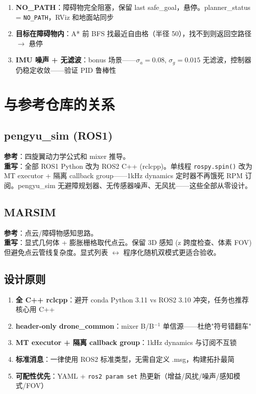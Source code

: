 \documentclass[12pt,a4paper]{article}
\begin{document}
\begin{enumerate}[nosep]
  \item \textbf{NO\_PATH}：障碍物完全阻塞，保留 last safe\_goal，悬停。planner\_status = \texttt{NO\_PATH}，RViz 和地面站同步
  \item \textbf{目标在障碍物内}：A* 前 BFS 找最近自由格（半径 50），找不到则返回空路径 $\to$ 悬停
  \item \textbf{IMU 噪声 + 无滤波}：bonus 场景——$\sigma_a=0.08$, $\sigma_g=0.015$ 无滤波，控制器仍稳定收敛——验证 PID 鲁棒性
\end{enumerate}


\section{与参考仓库的关系}

\subsection{pengyu\_sim (ROS1)}

\textbf{参考}：四旋翼动力学公式和 mixer 推导。\\
\textbf{重写}：全部 ROS1 Python 改为 ROS2 C++ (rclcpp)。单线程 \texttt{rospy.spin()} 改为 MT executor + 隔离 callback group——1kHz dynamics 定时器不再饿死 RPM 订阅。pengyu\_sim 无避障规划器、无传感器噪声、无风扰——这些全部从零设计。

\subsection{MARSIM}

\textbf{参考}：点云/障碍物感知思路。\\
\textbf{重写}：显式几何体 + 膨胀栅格取代点云。保留 3D 感知 (z 跨度检查、体素 FOV) 但避免点云管线复杂度。显式列表 $\leftrightarrow$ 程序化随机双模式更适合验收。

\subsection{设计原则}

\begin{enumerate}[nosep]
  \item \textbf{全 C++ rclcpp}：避开 conda Python 3.11 vs ROS2 3.10 冲突，任务也推荐核心用 C++
  \item \textbf{header-only drone\_common}：mixer B/B$^{-1}$ 单信源——杜绝"符号错翻车"
  \item \textbf{MT executor + 隔离 callback group}：1kHz dynamics 与订阅不互锁
  \item \textbf{标准消息}：一律使用 ROS2 标准类型，无需自定义 .msg，构建拓扑最简
  \item \textbf{可配性优先}：YAML + \texttt{ros2 param set} 热更新（增益/风扰/噪声/感知模式/FOV）
\end{enumerate}
\end{document}
